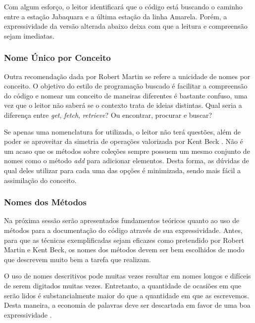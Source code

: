 

Com algum esforço, o leitor identificará que o código está buscando o caminho entre a estação Jabaquara e a última estação da linha Amarela. Porém, a expressividade da versão alterada abaixo deixa com que a leitura e compreensão sejam imediatas.




\subsubsection{Nome Único por Conceito}
Outra recomendação dada por Robert Martin \citep{Martin2008} se refere a unicidade de nomes por conceito. O objetivo do estilo de programação buscado é facilitar a compreensão do código e nomear um conceito de maneiras diferentes é bastante confuso, uma vez que o leitor não saberá se o contexto trata de ideias distintas. Qual seria a diferença entre \textit{get}, \textit{fetch}, \textit{retrieve}? Ou encontrar, procurar e buscar?
	
Se apenas uma nomenclatura for utilizada, o leitor não terá questões, além de poder se aproveitar da simetria de operações valorizada por Kent Beck \citep{Beck2007}. Não é um acaso que os métodos sobre coleções sempre possuem um mesmo conjunto de nomes como o método \textit{add} para adicionar elementos. Desta forma, as dúvidas de qual deles utilizar para cada uma das opções é minimizada, sendo mais fácil a assimilação do conceito.

\subsubsection{Nomes dos Métodos}
Na próxima sessão serão apresentados fundamentos teóricos quanto ao uso de métodos para a documentação do código através de sua expressividade. Antes, para que as técnicas exemplificadas sejam eficazes como pretendido por Robert Martin e Kent Beck, os nomes dos métodos devem ser bem escolhidos de modo que descrevem muito bem a tarefa que realizam.
	
O uso de nomes descritivos pode muitas vezes resultar em nomes longos e difíceis de serem digitados muitas vezes. Entretanto, a quantidade de ocasiões em que serão lidos é substancialmente maior do que a quantidade em que as escrevemos. Desta maneira, a economia de palavras deve ser descartada em favor de uma boa expressividade \citep{Beck2007}.
	

